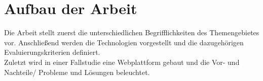 \label{sec:aufbau}
\section{Aufbau der Arbeit}
Die Arbeit stellt zuerst die unterschiedlichen Begrifflichkeiten des Themengebietes vor. Anschließend werden die Technologien vorgestellt und die dazugehörigen Evaluierungskriterien definiert. \\
Zuletzt wird in einer Fallstudie eine Webplattform gebaut und die Vor- und Nachteile/ Probleme und Lösungen beleuchtet.